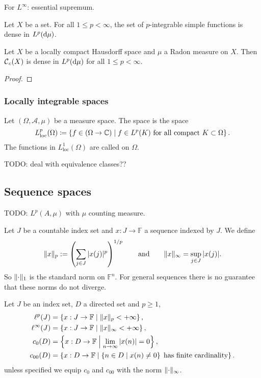 For $L^\infty$: essential supremum.

\begin{proposition}
Let $X$ be a set. For all $1\leq p < \infty$, the set of $p$-integrable simple functions is dense in $L^p(\operatorname{d \!}{\mu})$.
\end{proposition}


\begin{proposition}
Let $X$ be a locally compact Hausdorff space and $\mu$ a Radon measure on $X$. Then $\operatorname{\mathcal{C}}_c(X)$ is dense in $L^p(\operatorname{d \!}{\mu})$ for all $1\leq p < \infty$.
\end{proposition}
\begin{proof}

\end{proof}


\subsubsection{Locally integrable spaces}
\begin{definition}
Let $(\Omega, \mathcal{A}, \mu)$ be a measure space. The  space is the space
\[ L^p_\text{loc}(\Omega) \coloneqq \left\{ f \in (\Omega\to\mathbb{C}) \;\middle|\; \text{$f\in L^p(K)$ for all compact $K\subset \Omega$} \right\}. \]
The functions in $L^1_\text{loc}(\Omega)$ are called  on $\Omega$.
\end{definition}
TODO: deal with equivalence classes??

\subsection{Sequence spaces}
TODO:  $L^p(A,\mu)$ with $\mu$ counting measure.

Let $J$ be a countable index set and $x:J\to \mathbb{F}$ a sequence indexed by $J$. We define
\[ \lVert x\rVert_p := \left(\sum_{j\in J}|x(j)|^p\right)^{1/p} \qquad\text{and}\qquad \lVert x\rVert_\infty = \sup_{j\in J}|x(j)|. \]
So $\lVert\cdot\rVert_1$ is the standard norm on $\mathbb{F}^n$. For general sequences there is no guarantee that these norms do not diverge.
\begin{definition}
Let $J$ be an index set, $D$ a directed set and $p\geq 1$,
\begin{align*}
\ell^p(J) &= \left\{ x:J\to \mathbb{F} \;\middle|\; \lVert x\rVert_p < +\infty \right\},\\
\ell^\infty(J) &= \left\{ x:J\to \mathbb{F} \;\middle|\; \lVert x\rVert_\infty < +\infty \right\},\\
c_0(D) &= \left\{ x:D\to \mathbb{F} \;\middle|\; \lim_{n\to\infty}|x(n)| = 0 \right\}, \\
c_{00}(D) &= \left\{ x:D\to \mathbb{F} \;\middle|\; \left\{ n\in D \;\middle|\; x(n)\neq 0 \right\}\;\text{has finite cardinality} \right\}.
\end{align*}
unless specified we equip $c_0$ and $c_{00}$ with the norm $\lVert\cdot\rVert_\infty$.
\end{definition}

